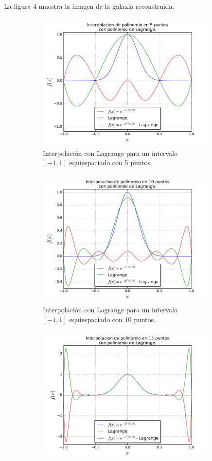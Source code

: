\documentclass[a4paper, 11pt, spanish]{article}
\begin{document}
La figura 4 muestra la imagen de la galaxia reconstruida.
\begin{figure}[!hbpt]
\centering
\begin{subfigure}{.5\textwidth}
  \centering
  \includegraphics[width=9cm, height=7cm]{img/lagrange5.pdf}
  \caption{Interpolaci\'on con Lagrange para un intervalo\\ $[-1,1]$ equiespaciado con 5 puntos.}
\end{subfigure}%
\begin{subfigure}{.5\textwidth}
  \centering
  \includegraphics[width=9cm, height=7cm]{img/lagrange10.pdf}
  \caption{Interpolaci\'on con Lagrange para un intervalo\\ $[-1,1]$ equiespaciado con 10 puntos.}
\end{subfigure}
\begin{subfigure}{.5\textwidth}
  \centering
  \includegraphics[width=9cm, height=7cm]{img/lagrange15.pdf}

\end{subfigure}
\end{figure}
\end{document}
